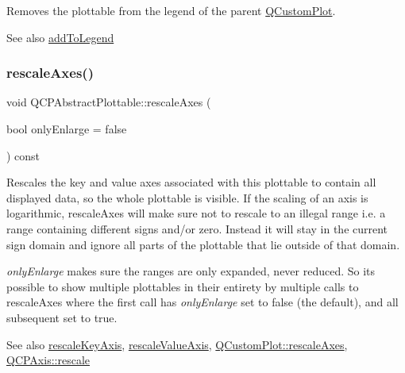 Removes the plottable from the legend of the parent \hyperlink{class_q_custom_plot}{Q\+Custom\+Plot}.

\begin{DoxySeeAlso}{See also}
\hyperlink{class_q_c_p_abstract_plottable_aa64e93cb5b606d8110d2cc0a349bb30f}{add\+To\+Legend} 
\end{DoxySeeAlso}
\mbox{\label{class_q_c_p_abstract_plottable_a1491c4a606bccd2d09e65e11b79eb882}} 
\subsubsection{\texorpdfstring{rescale\+Axes()}{rescaleAxes()}}
{\footnotesize\ttfamily void Q\+C\+P\+Abstract\+Plottable\+::rescale\+Axes (\begin{DoxyParamCaption}\item[{bool}]{only\+Enlarge = {\ttfamily false} }\end{DoxyParamCaption}) const}

Rescales the key and value axes associated with this plottable to contain all displayed data, so the whole plottable is visible. If the scaling of an axis is logarithmic, rescale\+Axes will make sure not to rescale to an illegal range i.\+e. a range containing different signs and/or zero. Instead it will stay in the current sign domain and ignore all parts of the plottable that lie outside of that domain.

{\itshape only\+Enlarge} makes sure the ranges are only expanded, never reduced. So it\textquotesingle{}s possible to show multiple plottables in their entirety by multiple calls to rescale\+Axes where the first call has {\itshape only\+Enlarge} set to false (the default), and all subsequent set to true.

\begin{DoxySeeAlso}{See also}
\hyperlink{class_q_c_p_abstract_plottable_ae96b83c961e257da116c6acf9c7da308}{rescale\+Key\+Axis}, \hyperlink{class_q_c_p_abstract_plottable_a714eaf36b12434cd71846215504db82e}{rescale\+Value\+Axis}, \hyperlink{class_q_custom_plot_ad86528f2cee6c7e446dea4a6e8839935}{Q\+Custom\+Plot\+::rescale\+Axes}, \hyperlink{class_q_c_p_axis_a499345f02ebce4b23d8ccec96e58daa9}{Q\+C\+P\+Axis\+::rescale} 
\end{DoxySeeAlso}
\mbox{\label{class_q_c_p_abstract_plottable_ae96b83c961e257da116c6acf9c7da308}} 
